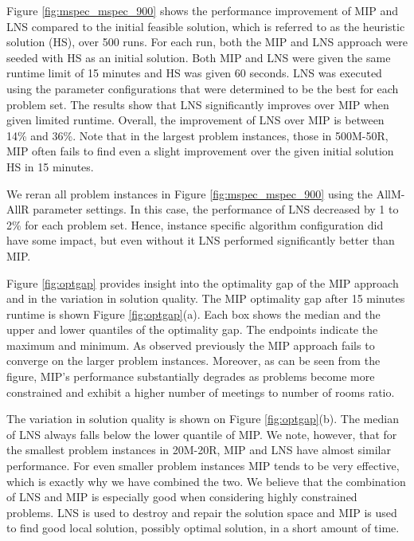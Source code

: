 Figure \ref{fig:mspec_mspec_900} shows the performance improvement of MIP and LNS compared to the initial feasible solution, which is referred to as the heuristic solution (HS), over 500 runs. For each run, both the MIP and LNS approach were seeded with HS as an initial solution. Both MIP and LNS were given the same runtime limit of 15 minutes and HS was given 60 seconds. LNS was executed using the parameter configurations that were determined to be the best for each problem set. The results show that LNS significantly improves over MIP when given limited runtime. Overall, the improvement of LNS over MIP is between 14\% and 36\%. Note that in the largest problem instances, those in 500M-50R, MIP often fails to find even a slight improvement over the given initial solution HS in 15 minutes.

We reran all problem instances in Figure \ref{fig:mspec_mspec_900} using the AllM-AllR parameter settings. In this case, the performance of LNS decreased by 1 to 2\% for each problem set. Hence, instance specific algorithm configuration did have some impact, but even without it LNS performed significantly better than MIP.

Figure \ref{fig:optgap} provides insight into the optimality gap of the MIP approach and in the variation in solution quality. The MIP optimality gap after 15 minutes runtime is shown Figure \ref{fig:optgap}(a). Each box shows the median and the upper and lower quantiles of the optimality gap. The endpoints indicate the maximum and minimum. As observed previously the MIP approach fails to converge on the larger problem instances. Moreover, as can be seen from the figure, MIP's performance substantially degrades as problems become more constrained and exhibit a higher number of meetings to number of rooms ratio.

The variation in solution quality is shown on Figure \ref{fig:optgap}(b). The median of LNS always falls below the lower quantile of MIP. We note, however, that for the smallest problem instances in 20M-20R, MIP and LNS have almost similar performance. For even smaller problem instances MIP tends to be very effective, which is exactly why we have combined the two. We believe that the combination of LNS and MIP is especially good when considering highly constrained problems. LNS is used to destroy and repair the solution space and MIP is used to find good local solution, possibly optimal solution, in a short amount of time.





